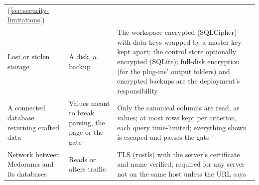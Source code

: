 \begin{xltabular}{\linewidth}{@{}P{3.4cm}P{3.6cm}L@{}}
  (\cref{sec:security-limitations}) \\
Lost or stolen storage & A disk, a backup & The workspace encrypted (SQLCipher) with data keys
  wrapped by a master key kept apart; the control store optionally encrypted (SQLite); full-disk
  encryption (for the plug-ins' output folders) and encrypted backups are the deployment's responsibility \\
A connected database returning crafted data & Values meant to break parsing, the page or the
  gate & Only the canonical columns are read, as values; at most  rows kept per
  criterion, each query time-limited; everything shown is escaped and passes the gate \\
Network between Medorama and its databases & Reads or alters traffic & TLS (rustls) with the
  server's certificate and name verified; required for any server not on the same host unless
  the URL says  \\
\end{xltabular}

